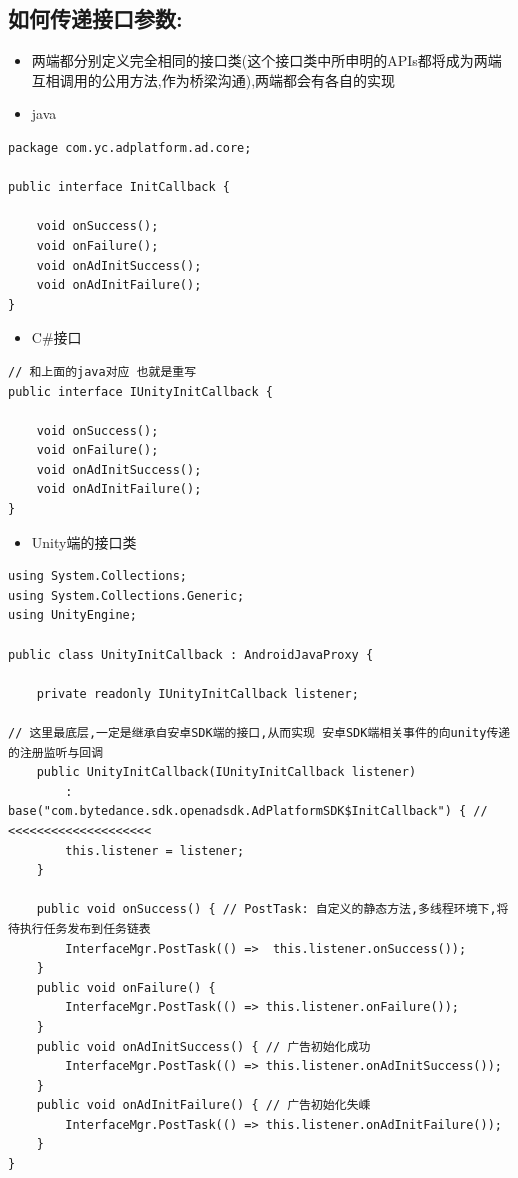 \documentclass[9pt, b5paper]{article}
\begin{document}
\subsection{如何传递接口参数:}
\label{sec-5-2}
\begin{itemize}
\item 两端都分别定义完全相同的接口类(这个接口类中所申明的APIs都将成为两端互相调用的公用方法,作为桥梁沟通),两端都会有各自的实现
\item java
\end{itemize}
\begin{verbatim}
package com.yc.adplatform.ad.core;

public interface InitCallback {

    void onSuccess();  
    void onFailure();
    void onAdInitSuccess(); 
    void onAdInitFailure(); 
}
\end{verbatim}
\begin{itemize}
\item C\#接口
\end{itemize}
\begin{verbatim}
// 和上面的java对应 也就是重写
public interface IUnityInitCallback {

    void onSuccess(); 
    void onFailure();
    void onAdInitSuccess(); 
    void onAdInitFailure(); 
}
\end{verbatim}
\begin{itemize}
\item Unity端的接口类
\end{itemize}
\begin{verbatim}
using System.Collections;
using System.Collections.Generic;
using UnityEngine;

public class UnityInitCallback : AndroidJavaProxy {

    private readonly IUnityInitCallback listener;

// 这里最底层,一定是继承自安卓SDK端的接口,从而实现 安卓SDK端相关事件的向unity传递的注册监听与回调
    public UnityInitCallback(IUnityInitCallback listener)
        : base("com.bytedance.sdk.openadsdk.AdPlatformSDK$InitCallback") { // <<<<<<<<<<<<<<<<<<<< 
        this.listener = listener;
    }
    
    public void onSuccess() { // PostTask: 自定义的静态方法,多线程环境下,将待执行任务发布到任务链表
        InterfaceMgr.PostTask(() =>  this.listener.onSuccess());
    }
    public void onFailure() {
        InterfaceMgr.PostTask(() => this.listener.onFailure());
    }
    public void onAdInitSuccess() { // 广告初始化成功 
        InterfaceMgr.PostTask(() => this.listener.onAdInitSuccess());
    }
    public void onAdInitFailure() { // 广告初始化失嵊
        InterfaceMgr.PostTask(() => this.listener.onAdInitFailure());
    }
}
\end{verbatim}
\end{document}
